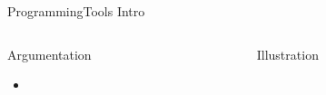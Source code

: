 %
\begin{Frame}{ProgrammingTools Intro}
  \begin{columns}[t]
    \begin{column}{\HW} %
      \begin{block}{Argumentation}
        \begin{itemize}
        \item 
        \end{itemize}
      \end{block} 
    \end{column}
    
    \begin{column}{\HW} %
      \begin{block}{Illustration}
      \end{block}   
    \end{column}
  \end{columns}  
\end{Frame}


